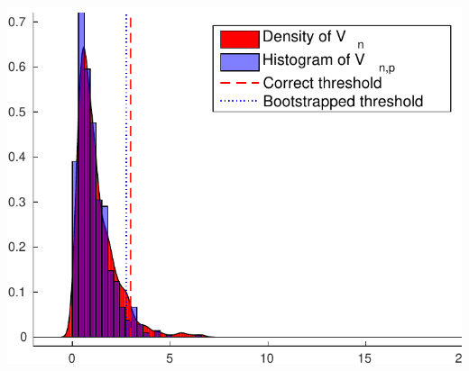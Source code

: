 \documentclass[landscape,a0]{a0poster_csml_v2}
\begin{document}
\begin{poster}
\begin{PosterColumn}
\begin{minipage}[c]{0.4\textwidth}
\includegraphics[width=\textwidth]{../img/permfail_ecdf1.pdf}

\end{minipage}





\end{PosterColumn}
\begin{PosterColumn}







\end{PosterColumn}
\end{poster}
\end{document}
